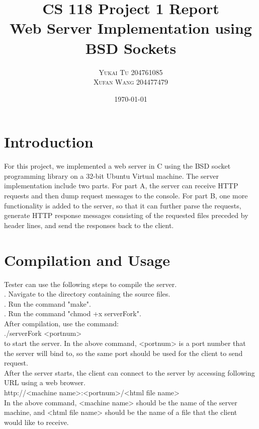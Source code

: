 \documentclass[a4paper, 11pt]{report}
\title{\LARGE{\textbf{CS 118 Project 1 Report}}\\
Web Server Implementation using BSD Sockets}
\author{\textsc{Yukai Tu 204761085}
\\\textsc{Xufan Wang 204477479}}
\date{\today}
\begin{document}
\maketitle

\section*{Introduction}

For this project, we implemented a web server in C using the BSD socket programming library on a 32-bit Ubuntu Virtual machine. The server implementation include two parts. For part A, the server can receive HTTP requests and then dump request messages to the console. For part B, one more functionality is added to the server, so that it can further parse the requests, generate HTTP response messages consisting of the requested files preceded by header lines, and send the responses back to the client.


\section*{Compilation and Usage}

Tester can use the following steps to compile the server.
\scriptsize
{\selectfont
\mbox{}\\
. Navigate to the directory containing the source files. \\
. Run the command "make".\\
. Run the command "chmod +x serverFork".\\
}
\normalsize
After compilation, use the command:
\scriptsize
{\selectfont
\mbox{}\\
\indent./serverFork <portnum>\\
}
\normalsize
to start the server. In the above command, <portnum> is a port number that the server will bind to, so the same port should be used for the client to send request.\\
After the server starts, the client can connect to the server by accessing following URL using a web browser.
\scriptsize
{\selectfont
\mbox{}\\
\indent http://<machine name>:<portnum>/<html file name>\\
}
\normalsize
In the above command, <machine name> should be the name of the server machine, and <html file name> should be the name of a file that the client would like to receive.
\end{document}

